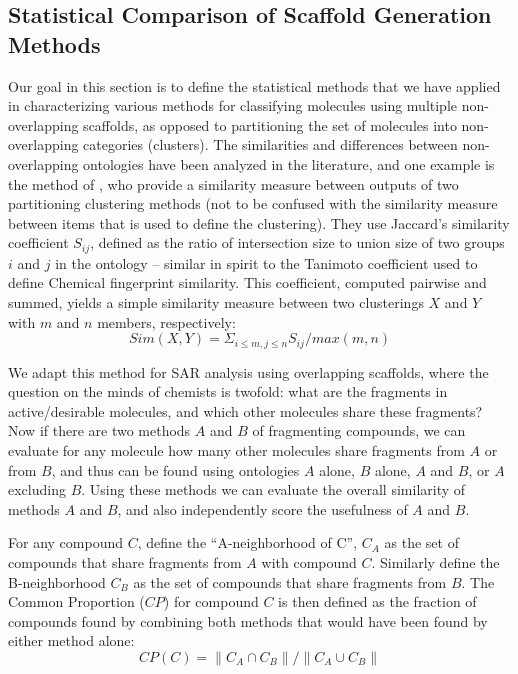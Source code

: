 \documentclass[journal=jacsat,manuscript=article]{achemso}
\begin{document}
\subsection{Statistical Comparison of Scaffold Generation Methods}
\label{sec:statmethod}
Our goal in this section is to define the statistical methods that we
have applied in characterizing various methods for classifying
molecules using multiple non-overlapping scaffolds, as opposed to
partitioning the set of molecules into non-overlapping categories
(clusters). The similarities and differences between non-overlapping
ontologies have been analyzed in the literature, and one example is
the method of \citeauthor{Torres2009}, who provide a similarity
measure between outputs of two partitioning clustering methods (not to
be confused with the similarity measure between items that is used to
define the clustering). They use Jaccard's similarity coefficient
$S_{ij}$, defined as the ratio of intersection size to union size of
two groups $i$ and $j$ in the ontology -- similar in spirit to the
Tanimoto coefficient used to define Chemical fingerprint similarity.
This coefficient, computed pairwise and summed, yields a simple
similarity measure between two clusterings $X$ and $Y$ with $m$ and
$n$ members, respectively:
\begin{equation}
Sim(X,Y) = \Sigma_{i \le m, j \le n}{S_{ij} / max(m,n)}
\end{equation}

We adapt this method for SAR analysis using overlapping scaffolds,
where the question on the minds of chemists is twofold: what are the
fragments in active/desirable molecules, and which other molecules
share these fragments? Now if there are two methods $A$ and $B$ of
fragmenting compounds, we can evaluate for any molecule how many other
molecules share fragments from $A$ or from $B$, and thus can be found
using ontologies $A$ alone, $B$ alone, $A$ and $B$, or $A$ excluding
$B$.  Using these methods we can evaluate the overall similarity of
methods $A$ and $B$, and also independently score the usefulness of
$A$ and $B$.

For any compound $C$, define the ``A-neighborhood of C'', $C_A$ as the
set of compounds that share fragments from $A$ with compound
$C$. Similarly define the B-neighborhood $C_B$ as the set of compounds
that share fragments from $B$. The Common Proportion ($CP$) for
compound $C$ is then defined as the fraction of compounds found by
combining both methods that would have been found by either method
alone:
\begin{equation}
CP(C) = \| C_A \cap C_B \| / \| C_A \cup C_B \|
\end{equation}
\end{document}
